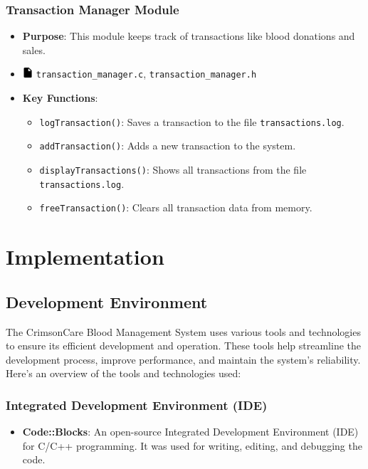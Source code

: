 \documentclass[12pt,a4paper]{report}
\begin{document}
\subsection{Transaction Manager Module}
\begin{itemize}
    \item \normalsize \textbf{Purpose}: This module keeps track of transactions like blood donations and sales.
    \item \normalsize \includegraphics[width=0.03\textwidth]{../resources/assets/images/file_icon.png} \texttt{transaction\_manager.c}, \texttt{transaction\_manager.h}
    \item \normalsize \textbf{Key Functions}:
    \begin{itemize}
        \item \texttt{logTransaction()}: Saves a transaction to the file \texttt{transactions.log}.
        \item \texttt{addTransaction()}: Adds a new transaction to the system.
        \item \texttt{displayTransactions()}: Shows all transactions from the file \texttt{transactions.log}.
        \item \texttt{freeTransaction()}: Clears all transaction data from memory.
    \end{itemize}
\end{itemize}

\chapter{Implementation}
\section{Development Environment}
The CrimsonCare Blood Management System uses various tools and technologies to ensure its efficient development and operation.
These tools help streamline the development process, improve performance, and maintain the system's reliability.
Here's an overview of the tools and technologies used:

\subsection*{Integrated Development Environment (IDE)}
\begin{itemize}
    \item \textbf{Code::Blocks}: An open-source Integrated Development Environment (IDE) for C/C++ programming.
    It was used for writing, editing, and debugging the code.
\end{itemize}
\end{document}
